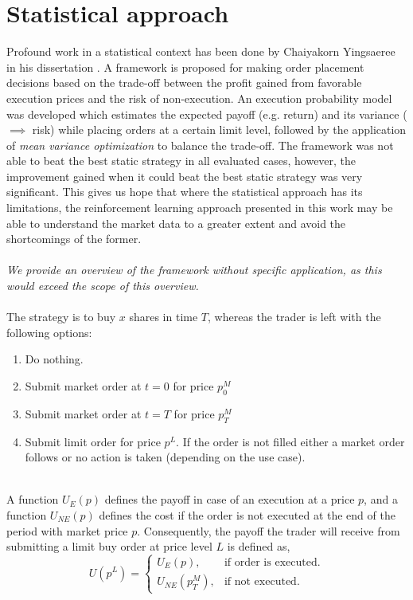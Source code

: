 \section{Statistical approach}

Profound work in a statistical context has been done by Chaiyakorn Yingsaeree in his dissertation \cite{yingsaeree2012algorithmic}.
A framework is proposed for making order placement decisions based on the trade-off between the profit gained from favorable execution prices and the risk of non-execution.
An execution probability model was developed which estimates the expected payoff (e.g. return) and its variance ($\implies$ risk) while placing orders at a certain limit level, followed by the application of \textit{mean variance optimization} to balance the trade-off.
The framework was not able to beat the best static strategy in all evaluated cases, however, the improvement gained when it could beat the best static strategy was very significant.
This gives us hope that where the statistical approach has its limitations, the reinforcement learning approach presented in this work may be able to understand the market data to a greater extent and avoid the shortcomings of the former.
\\
\\
\textit{We provide an overview of the framework without specific application, as this would exceed the scope of this overview.}
\\
\\
The strategy is to buy $x$ shares in time $T$, whereas the trader is left with the following options:
\begin{enumerate}
    \item Do nothing.
    \item Submit market order at $t=0$ for price $p_{0}^M$
    \item Submit market order at $t=T$ for price $p_{T}^M$
    \item Submit limit order for price $p^L$. If the order is not filled either a market order follows or no action is taken (depending on the use case).
\end{enumerate}
\hfill
\\
A function $U_{E}(p)$ defines the payoff in case of an execution at a price $p$, and a function $U_{NE}(p)$ defines the cost if the order is not executed at the end of the period with market price $p$. 
Consequently, the payoff the trader will receive from submitting a limit buy order at price level $L$ is defined as,
\begin{equation}
    U(p^L) = \begin{cases}
                U_E(p), & \text{if order is executed}.\\
                U_{NE}(p_T^M), & \text{if not executed}.
             \end{cases}
\end{equation}
